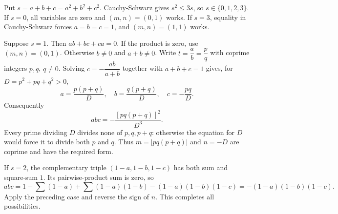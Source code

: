 Put $s=a+b+c=a^2+b^2+c^2$. Cauchy-Schwarz gives $s^2\le3s$, so $s\in\{0,1,2,3\}$. If $s=0$, all variables are zero and $(m,n)=(0,1)$ works. If $s=3$, equality in Cauchy-Schwarz forces $a=b=c=1$, and $(m,n)=(1,1)$ works.

Suppose $s=1$. Then $ab+bc+ca=0$. If the product is zero, use $(m,n)=(0,1)$. Otherwise $b\ne0$ and $a+b\ne0$. Write $t=\dfrac{a}{b}=\dfrac{p}{q}$ with coprime integers $p,q$, $q\ne0$. Solving $c=-\dfrac{ab}{a+b}$ together with $a+b+c=1$ gives, for $D=p^2+pq+q^2>0$,
\[
a=\dfrac{p(p+q)}{D},\quad b=\dfrac{q(p+q)}{D},\quad c=-\dfrac{pq}{D}.
\]
Consequently
\[
abc=-\dfrac{[pq(p+q)]^2}{D^3}.
\]
Every prime dividing $D$ divides none of $p,q,p+q$: otherwise the equation for $D$ would force it to divide both $p$ and $q$. Thus $m=|pq(p+q)|$ and $n=-D$ are coprime and have the required form.

If $s=2$, the complementary triple $(1-a,1-b,1-c)$ has both sum and square-sum $1$. Its pairwise-product sum is zero, so
\[
abc=1-\sum(1-a)+\sum(1-a)(1-b)-(1-a)(1-b)(1-c)
=-(1-a)(1-b)(1-c).
\]
Apply the preceding case and reverse the sign of $n$. This completes all possibilities.
